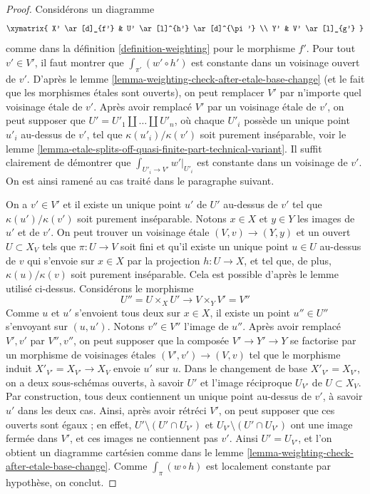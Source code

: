 \begin{proof}
Considérons un diagramme
$$
\xymatrix{
X' \ar[d]_{f'} & U' \ar[l]^{h'} \ar[d]^{\pi'} \\
Y' & V' \ar[l]_{g'}
}
$$
comme dans la définition \ref{definition-weighting} pour le morphisme $f'$.
Pour tout $v' \in V'$, il faut montrer que $\int_{\pi'} (w' \circ h')$ est
constante dans un voisinage ouvert de $v'$. D'après le
lemme \ref{lemma-weighting-check-after-etale-base-change}
(et le fait que les morphismes \'etales sont ouverts),
on peut remplacer $V'$ par n'importe quel voisinage \'etale de $v'$.
Après avoir remplacé $V'$ par un voisinage \'etale de $v'$,
on peut supposer que $U' = U'_1 \amalg \ldots \amalg U'_n$,
où chaque $U'_i$ possède un unique point $u'_i$ au-dessus de $v'$,
tel que $\kappa(u'_i)/\kappa(v')$ soit purement inséparable,
voir le lemme \ref{lemma-etale-splits-off-quasi-finite-part-technical-variant}.
Il suffit clairement de démontrer que $\int_{U'_i \to V'} w'|_{U'_i}$
est constante dans un voisinage de $v'$.
On est ainsi ramené au cas traité dans le paragraphe suivant.

\medskip\noindent
On a $v' \in V'$ et il existe un unique point $u'$ de $U'$
au-dessus de $v'$ tel que $\kappa(u')/\kappa(v')$ soit purement inséparable.
Notons $x \in X$ et $y \in Y$ les images de $u'$ et de $v'$.
On peut trouver un voisinage \'etale $(V, v) \to (Y, y)$
et un ouvert $U \subset X_V$ tels que $\pi : U \to V$ soit fini
et qu'il existe un unique point $u \in U$ au-dessus de $v$
qui s'envoie sur $x \in X$ par la projection $h : U \to X$,
et tel que, de plus, $\kappa(u)/\kappa(v)$ soit
purement inséparable. Cela est possible d'après le lemme utilisé ci-dessus.
Considérons le morphisme
$$
U'' = U \times_X U' \longrightarrow V \times_Y V' = V''
$$
Comme $u$ et $u'$ s'envoient tous deux sur $x \in X$, il existe un point
$u'' \in U''$ s'envoyant sur $(u, u')$. Notons $v'' \in V''$
l'image de $u''$. Après avoir remplacé $V', v'$ par $V'', v''$,
on peut supposer que la composée $V' \to Y' \to Y$ se factorise
par un morphisme de voisinages \'etales $(V', v') \to (V, v)$
tel que le morphisme induit $X'_{V'} = X_{V'} \to X_V$ envoie
$u'$ sur $u$. Dans le changement de base $X'_{V'} = X_{V'}$, on a
deux sous-schémas ouverts, à savoir $U'$ et l'image réciproque $U_{V'}$ de
$U \subset X_V$. Par construction, tous deux contiennent un unique point
au-dessus de $v'$, à savoir $u'$ dans les deux cas.
Ainsi, après avoir rétréci $V'$, on peut supposer que ces ouverts
sont égaux ; en effet, $U' \setminus (U' \cap U_{V'})$ et
$U_{V'} \setminus (U' \cap U_{V'})$ ont
une image fermée dans $V'$, et ces images ne contiennent pas $v'$.
Ainsi $U' = U_{V'}$, et l'on obtient un diagramme cartésien comme dans le
lemme \ref{lemma-weighting-check-after-etale-base-change}.
Comme $\int_\pi (w \circ h)$ est localement constante
par hypothèse, on conclut.
\end{proof}

